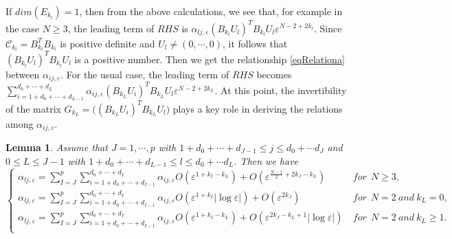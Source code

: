 \documentclass[11pt,reqno]{article}
\newtheorem{lemma}[teo]{Lemma}
\numberwithin{equation}{section}
\newcommand\e\varepsilon
\begin{document}
If $dim(E_{k_l})=1$, then from  the above calculations, we see that, for example in the case $N\ge 3$, the leading term of  $RHS$  is $\alpha_{lj,\e}(B_{ k_l}U_l)^TB_{ k_l}U_l\e^{N-2+2{ k_l}}$. Since $\mathcal{C}_{k_l}=B_{k_l}^TB_{k_l}$ is positive definite and $U_l\neq (0,\cdots,0)$, it follows that $(B_{ k_l}U_l)^TB_{ k_l}U_l$  is a positive number. Then we get the relationship \eqref{eqRelationa} between $\alpha_{ij,\e}$.  For the usual case, the leading term of $RHS$ becomes $\sum_{i=1+d_0+\cdots+d_{L-1}}^{d_0+\cdots+d_L}\alpha_{ij,\e}(B_{k_L}U_i)^TB_{k_L}U_l \e^{N-2+2k_L}$. At this point, the invertibility of the matrix $G_{k_L}=\Big((B_{k_L}U_i)^TB_{k_L}U_l\Big)$ plays a key role in deriving the relations among $\alpha_{ij,\e}$.

\begin{lemma}\label{lem2204}
 Assume that $J=1,\cdots,p$ with $1+d_0+\cdots+d_{J-1}\leq j\leq d_0+\cdots d_{J}$ and $0\leq L\leq J-1$ with $1+d_0+\cdots+d_{L-1}\leq l\leq d_0+\cdots d_{L}$. Then we have
    \begin{equation}\label{eq2301-3}
    \begin{cases}
        \displaystyle\alpha_{lj,\e}=\sum_{I=J}^p\sum_{i=1+d_0+\cdots+d_{I-1}}^{d_0+\cdots+d_I}\alpha_{ij,\e}O(\e^{1+k_I-k_L})+O(\e^{\frac{N-1}{2}+2k_J-k_L})&\ for \ \ N\ge3,\\
\displaystyle\alpha_{lj,\e}=\sum_{I=J}^p\sum_{i=1+d_0+\cdots+d_{I-1}}^{d_0+\cdots+d_I}\alpha_{ij,\e}O(\e^{1+k_I}|\log\e|)+O(\e^{2k_J}) &\ for \ \ N=2\ and\ k_L=0,\\
    \displaystyle\alpha_{lj,\e}=\sum_{I=J}^p\sum_{i=1+d_0+\cdots+d_{I-1}}^{d_0+\cdots+d_I}\alpha_{ij,\e}O(\e^{1+k_I-k_L})+O(\e^{2k_J-k_L+1}|\log\e|)&\ for \ \ N=2\ and\  k_L\ge 1.\\
    \end{cases}
\end{equation}
\end{lemma}
\end{document}
